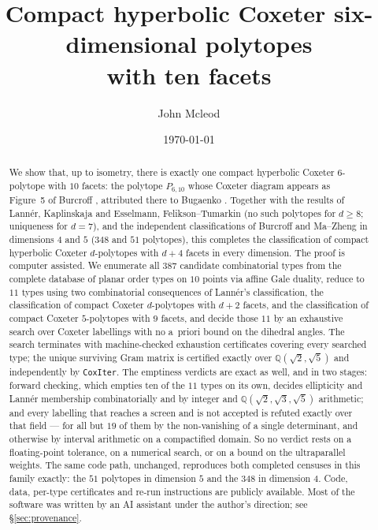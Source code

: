 \documentclass[11pt,reqno]{amsart}
\theoremstyle{plain}
\theoremstyle{definition}
\newcommand{\QQ}{\mathbb{Q}}
\newcommand{\PP}{P_{6,10}}
\newcommand{\NumTypes}{387}
\newcommand{\NumRequired}{11}
\newcommand{\WildRootBox}{19}
\begin{document}
\title[Compact hyperbolic Coxeter six-dimensional polytopes with ten facets]
      {Compact hyperbolic Coxeter six-dimensional polytopes\\ with ten facets}

\author{John Mcleod}
\address{Solvo.ai}

\date{\today}


\begin{abstract}
We show that, up to isometry, there is exactly one compact hyperbolic Coxeter
$6$-polytope with $10$ facets: the polytope $\PP$ whose Coxeter diagram appears
as Figure~5 of Burcroff \cite{Burcroff2024}, attributed there to Bugaenko
\cite{Bugaenko1984}. Together with the results
of Lann\'er, Kaplinskaja and Esselmann, Felikson--Tumarkin (no such polytopes for
$d\ge 8$; uniqueness for $d=7$), and the independent classifications of
Burcroff and Ma--Zheng in dimensions $4$ and $5$ ($348$ and $51$ polytopes),
this completes the classification of compact hyperbolic Coxeter $d$-polytopes
with $d+4$ facets in every dimension. The proof is computer assisted. We
enumerate all $\NumTypes$ candidate combinatorial types from the complete
database of planar order types on $10$ points via affine Gale duality, reduce to
$\NumRequired$ types using two combinatorial consequences of Lann\'er's
classification, the classification of compact Coxeter $d$-polytopes with $d+2$
facets, and the classification of compact Coxeter $5$-polytopes
with $9$ facets, and decide those $\NumRequired$ by an exhaustive search over
Coxeter
labellings with no a~priori bound on the dihedral angles. The search terminates
with machine-checked exhaustion certificates covering every searched type; the unique surviving Gram matrix is certified exactly over
$\QQ(\sqrt2,\sqrt5)$ and independently by \texttt{CoxIter}. The emptiness verdicts
are exact as well, and in two stages: forward checking, which empties ten of the
$\NumRequired$ types on its own, decides ellipticity and Lann\'er membership
combinatorially and by integer and $\QQ(\sqrt2,\sqrt3,\sqrt5)$ arithmetic; and every
labelling that reaches a screen and is not accepted is refuted exactly over that
field --- for all but $\WildRootBox$ of them by the non-vanishing of a single
determinant, and otherwise by interval arithmetic on a compactified domain. So no
verdict rests on a floating-point tolerance, on a numerical search, or on a bound on
the ultraparallel weights. The same code path,
unchanged, reproduces both completed censuses in this family exactly: the $51$
polytopes in dimension $5$ and the $348$ in dimension $4$.
Code, data, per-type certificates and re-run instructions are publicly
available. Most of the software was written by an AI assistant under the
author's direction; see \S\ref{sec:provenance}.
\end{abstract}
\end{document}
